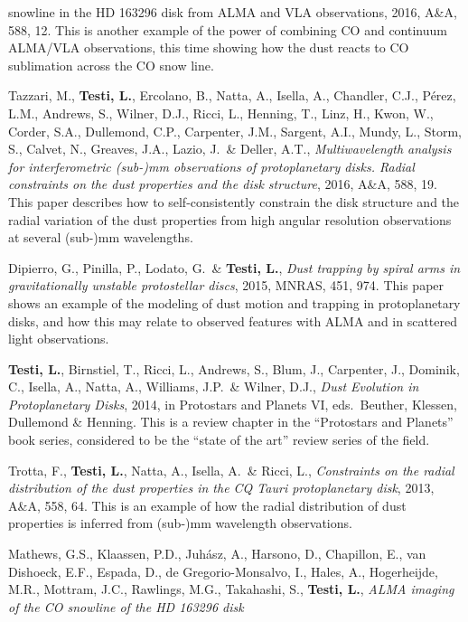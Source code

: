\documentclass[10pt,fleqn,twoside]{article}
\begin{document}
\begin{literature}
{    snowline in the HD 163296 disk from ALMA and VLA observations}, 2016,
  A\&A, 588, 12. This is another example of the power of combining CO and
  continuum ALMA/VLA observations, this time showing how the dust reacts
  to CO sublimation across the CO snow line.
\item Tazzari, M., {\bf Testi, L.}, Ercolano, B., Natta, A., Isella, A.,
  Chandler, C.J., Pérez, L.M., Andrews, S., Wilner, D.J., Ricci, L.,
  Henning, T., Linz, H., Kwon, W., Corder, S.A., Dullemond, C.P., Carpenter,
  J.M., Sargent, A.I., Mundy, L., Storm, S., Calvet, N., Greaves, J.A.,
  Lazio, J.\ \& Deller, A.T., {\em Multiwavelength analysis for
    interferometric (sub-)mm observations of protoplanetary disks. Radial
    constraints on the dust properties and the disk structure}, 2016, A\&A,
  588, 19. This paper describes how to self-consistently constrain the disk
  structure and the radial variation of the dust properties from high
  angular resolution observations at several (sub-)mm wavelengths.
\item Dipierro, G., Pinilla, P., Lodato, G.\ \& {\bf Testi, L.}, {\em Dust
    trapping by spiral arms in gravitationally unstable protostellar discs},
  2015, MNRAS, 451, 974. This paper shows an example of the modeling of dust
  motion and trapping in protoplanetary disks, and how this may relate to
  observed features with ALMA and in scattered light observations.
\item {\bf Testi, L.}, Birnstiel, T., Ricci, L., Andrews, S., Blum, J.,
  Carpenter, J., Dominik, C., Isella, A., Natta, A., Williams, J.P.\ \&
  Wilner, D.J., {\em Dust Evolution in Protoplanetary Disks}, 2014, in
  Protostars and Planets VI, eds.~Beuther, Klessen, Dullemond \&
  Henning. This is a review chapter in the ``Protostars and Planets'' book
  series, considered to be the ``state of the art'' review series of the
  field.
\item Trotta, F., {\bf Testi, L.}, Natta, A., Isella, A.\ \& Ricci, L., {\em
    Constraints on the radial distribution of the dust properties in the CQ
    Tauri protoplanetary disk}, 2013, A\&A, 558, 64. This is an example of
  how the radial distribution of dust properties is inferred from (sub-)mm
  wavelength observations.
\item Mathews, G.S., Klaassen, P.D., Juhász, A., Harsono, D., Chapillon, E.,
  van Dishoeck, E.F., Espada, D., de Gregorio-Monsalvo, I., Hales, A.,
  Hogerheijde, M.R., Mottram, J.C., Rawlings, M.G., Takahashi, S., {\bf
    Testi, L.}, {\em ALMA imaging of the CO snowline of the HD 163296 disk
}
\end{literature}
\end{document}
